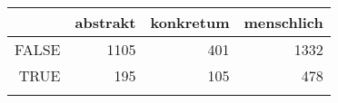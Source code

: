 \begin{tabular}{rrrr}
  \lsptoprule
 & abstrakt & konkretum & menschlich \\ 
  \midrule
FALSE & 1105 & 401 & 1332 \\ 
  TRUE & 195 & 105 & 478 \\ 
   \lspbottomrule
\end{tabular}
